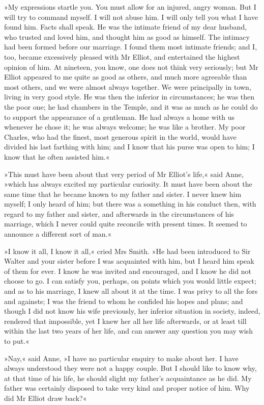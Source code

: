 »My expressions startle you. You must allow for an injured, angry woman. But I will try to command myself. I will not abuse him. I will only tell you what I have found him. Facts shall speak. He was the intimate friend of my dear husband, who trusted and loved him, and thought him as good as himself. The intimacy had been formed before our marriage. I found them most intimate friends; and I, too, became excessively pleased with Mr Elliot, and entertained the highest opinion of him. At nineteen, you know, one does not think very seriously; but Mr Elliot appeared to me quite as good as others, and much more agreeable than most others, and we were almost always together. We were principally in town, living in very good style. He was then the inferior in circumstances; he was then the poor one; he had chambers in the Temple, and it was as much as he could do to support the appearance of a gentleman. He had always a home with us whenever he chose it; he was always welcome; he was like a brother. My poor Charles, who had the finest, most generous spirit in the world, would have divided his last farthing with him; and I know that his purse was open to him; I know that he often assisted him.«

»This must have been about that very period of Mr Elliot's life,« said Anne, »which has always excited my particular curiosity. It must have been about the same time that he became known to my father and sister. I never knew him myself; I only heard of him; but there was a something in his conduct then, with regard to my father and sister, and afterwards in the circumstances of his marriage, which I never could quite reconcile with present times. It seemed to announce a different sort of man.«

»I know it all, I know it all,« cried Mrs Smith. »He had been introduced to Sir Walter and your sister before I was acquainted with him, but I heard him speak of them for ever. I know he was invited and encouraged, and I know he did not choose to go. I can satisfy you, perhaps, on points which you would little expect; and as to his marriage, I knew all about it at the time. I was privy to all the fors and againsts; I was the friend to whom he confided his hopes and plans; and though I did not know his wife previously, her inferior situation in society, indeed, rendered that impossible, yet I knew her all her life afterwards, or at least till within the last two years of her life, and can answer any question you may wish to put.«

»Nay,« said Anne, »I have no particular enquiry to make about her. I have always understood they were not a happy couple. But I should like to know why, at that time of his life, he should slight my father's acquaintance as he did. My father was certainly disposed to take very kind and proper notice of him. Why did Mr Elliot draw back?«

